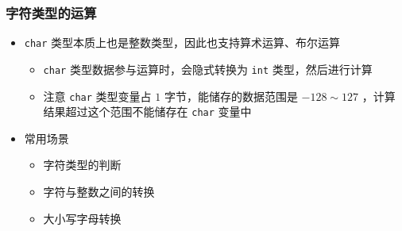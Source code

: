 \begin{frame}[fragile]
    \frametitle{字符类型的运算}

    \begin{itemize}
        \item<1-> \lstinline|char| 类型本质上也是整数类型，因此也支持算术运算、布尔运算
        
        \begin{itemize}
            \item \lstinline|char| 类型数据参与运算时，会隐式转换为 \lstinline|int| 类型，然后进行计算
            \item 注意 \lstinline|char| 类型变量占 $1$ 字节，能储存的数据范围是 $-128 \sim 127$ ，计算结果超过这个范围不能储存在 \lstinline|char| 变量中
        \end{itemize}

        \item<2-> 常用场景
        
        \begin{itemize}
            \item 字符类型的判断
            \item 字符与整数之间的转换
            \item 大小写字母转换
        \end{itemize}

    \end{itemize}

\end{frame}

